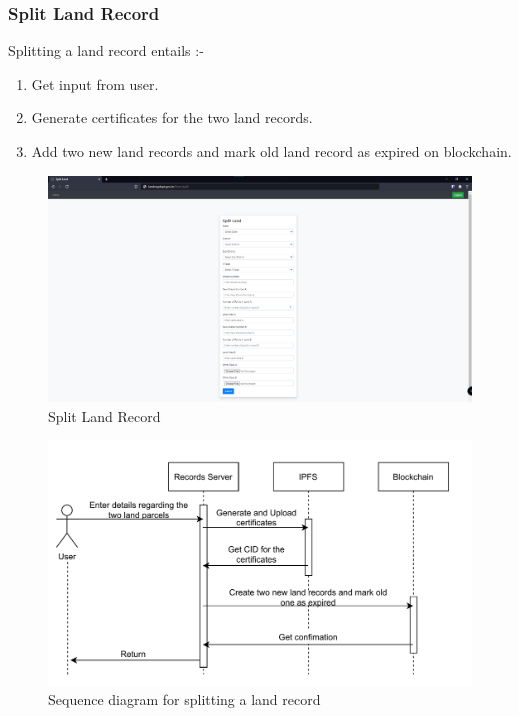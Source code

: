 \documentclass{article}
\begin{document}
        \subsubsection{Split Land Record}
            Splitting a land record entails :-
            \begin{enumerate}
                \item Get input from user.
                \item Generate certificates for the two land records.
                \item Add two new land records and mark old land record as expired on blockchain.
            \end{enumerate}
            
            \begin{figure}[htbp]
                \includegraphics[scale=0.25]{records_split}
                \centering
                \caption{Split Land Record}
            \end{figure}

            \begin{figure}[htbp]
                \includegraphics[scale=0.25]{records_seq_split_land}
                \centering
                \caption{Sequence diagram for splitting a land record}
            \end{figure}
            
\end{document}
